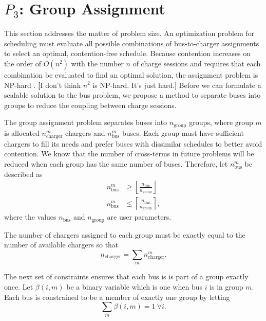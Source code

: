 \section{$P_3$: Group Assignment\label{sec:groupAssignment}}
This section addresses the matter of problem size.  An optimization problem for scheduling must evaluate all possible combinations of bus-to-charger assignments to select an optimal, contention-free schedule. Because contention increases on the order of $O(n^2)$ with the number $n$ of charge sessions and requires that each combination be evaluated to find an optimal solution, the assignment problem is NP-hard \cite{kolesar_branch_1967}. {\textbf [I don't think $n^2$ is NP-hard.  It's just hard.]} Before we can formulate a scalable solution to the bus problem, we propose a method to separate buses into groups to reduce the coupling between charge sessions.
\par The group assignment problem separates buses into $n_{\text{group}}$ groups, where group $m$ is allocated $n^m_{\text{charger}}$ chargers and $n^m_{\text{bus}}$ buses. Each group must have sufficient chargers to fill its needs and prefer buses with dissimilar schedules to better avoid contention. 
We know that the number of cross-terms in future problems will be reduced when each group has the same number of buses. Therefore, let $n^m_{\text{bus}}$ be described as
\begin{equation}\label{eqn:groups:nBusPerGroup}\begin{aligned}
	n^m_{\text{bus}} &\ge \left \lfloor \frac{n_{\text{bus}}}{n_{\text{group}}} \right \rfloor \\
	n^m_{\text{bus}} &\le \left \lceil \frac{n_{\text{bus}}}{n_{\text{group}}} \right \rceil,
\end{aligned}\end{equation}
where the values $n_\text{bus}$ and $n_\text{group}$ are user parameters.
\par The number of chargers assigned to each group must be exactly equal to the number of available chargers so that
\begin{equation}\label{eqn:groups:nTotalCharger}
	n_{\text{charger}} = \sum_mn_{\text{charger}}^m.
\end{equation}
\par The next set of constraints ensures that each bus is is part of a group exactly once. Let $\beta(i,m)$ be a binary variable which is one when bus $i$ is in group $m$. Each bus is constrained to be a member of exactly one group by letting
\begin{equation}\label{eqn:groups:groupId}
	\sum_m\beta(i,m) = 1 \ \forall i.
\end{equation}
